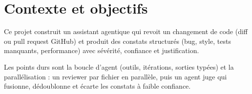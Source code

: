 \section{Contexte et objectifs}
Ce projet construit un assistant agentique qui revoit un changement de code (diff ou pull request GitHub) et produit des constats structur\'es (bug, style, tests manquants, performance) avec s\'ev\'erit\'e, confiance et justification.

Les points durs sont la boucle d'agent (outils, it\'erations, sorties typ\'ees) et la parall\'elisation : un reviewer par fichier en parall\`ele, puis un agent juge qui fusionne, d\'edoublonne et \'ecarte les constats \`a faible confiance.
